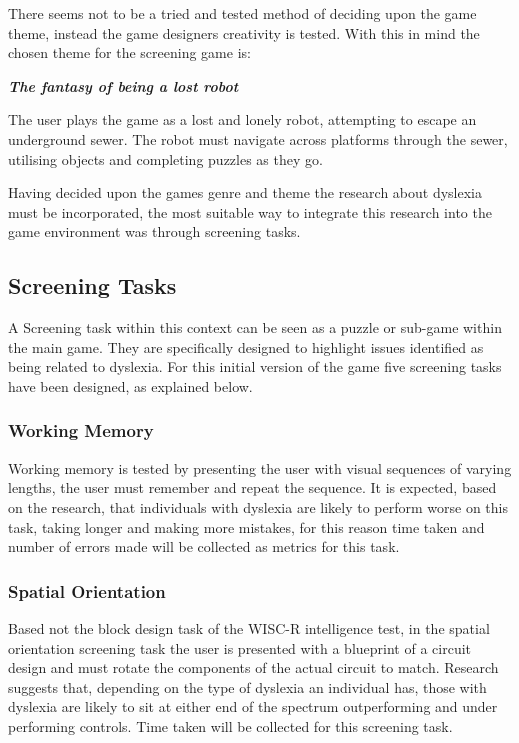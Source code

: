 \documentclass[journal]{IEEEtran}
\begin{document}
There seems not to be a tried and tested method of deciding upon the game theme, instead the game designers creativity is tested. With this in mind the chosen theme for the screening game is:
\begin{center}
\textit{\textbf{The fantasy of being a lost robot}}
\end{center}
The user plays the game as a lost and lonely robot, attempting to escape an underground sewer. The robot must navigate across platforms  through the sewer, utilising objects and completing puzzles as they go.

Having decided upon the games genre and theme the research about dyslexia must be incorporated, the most suitable way to integrate this research into the game environment was through screening tasks. 

\subsection{Screening Tasks}
\label{sec:screening_Tasks}
A Screening task within this context can be seen as a puzzle or sub-game within the main game. They are specifically designed to highlight issues identified as being related to dyslexia. 
For this initial version of the game five screening tasks have been designed, as explained below.

\subsubsection{Working Memory} 
Working memory is tested by presenting the user with visual sequences of varying lengths, the user must remember and repeat the sequence. It is expected, based on the research, that individuals with dyslexia are likely to perform worse on this task, taking longer and making more mistakes, for this reason time taken and number of errors made will be collected as metrics for this task.

\subsubsection{Spatial Orientation} 
Based not the block design task of the WISC-R intelligence test, in the spatial orientation screening task the user is presented with a blueprint of a circuit design and must rotate the components of the actual circuit to match. Research suggests that, depending on the type of dyslexia an individual has, those with dyslexia are likely to sit at either end of the spectrum outperforming and under performing controls. Time taken will be collected for this screening task.
\end{document}
